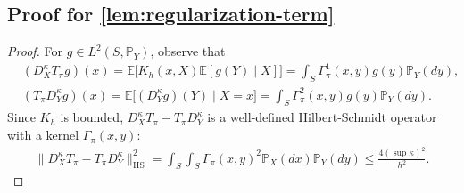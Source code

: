\documentclass{article}
\begin{document}
\subsection{Proof for \cref{lem:regularization-term}}\label{pf:lem:regularization-term}
\begin{proof}
	For $g \in L^2(S,\mathbb{P}_Y)$, observe that
	\begin{align*}
		&(D_X^{\kappa}T_{\pi}g)(x) = \mathbb{E}\Big[K_h(x,X)\mathbb{E}\left[g(Y) \mid X\right]\Big] = \int_S \Gamma_\pi^1(x,y)g(y)\mathbb{P}_Y(dy) , \\
		&(T_{\pi}D_Y^{\kappa}g)(x) = \mathbb{E}\Big[(D_Y^{\kappa}g)(Y) \mid X = x\Big] = \int_S \Gamma_\pi^2(x,y)g(y) \mathbb{P}_Y(dy) .
	\end{align*}
	Since $K_h$ is bounded, $D_X^{\kappa}T_{\pi} - T_{\pi}D_Y^{\kappa}$ is a well-defined Hilbert-Schmidt operator with a kernel $\Gamma_\pi(x,y)$:
	\begin{align*}
		\| D_X^{\kappa}T_{\pi} - T_{\pi}D_Y^{\kappa} \|_{\mathrm{HS}}^2 = \int_S\int_S \Gamma_\pi(x,y)^2\mathbb{P}_X(dx)\mathbb{P}_Y(dy) \leq \frac{4(\sup\kappa)^2}{h^2} .
	\end{align*}
\end{proof}
\end{document}
